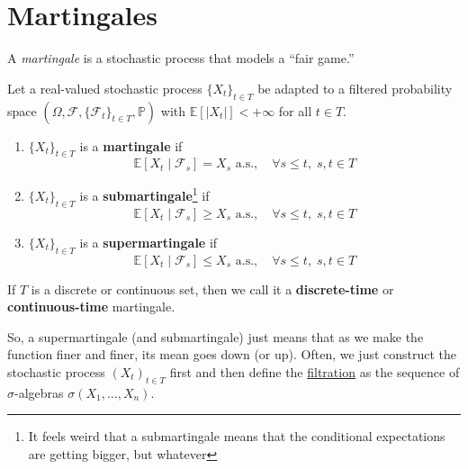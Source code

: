 \section{Martingales}

	A \textit{martingale} is a stochastic process that models a ``fair game.'' 

	\begin{definition}
		\label{def:martingale}
		Let a real-valued stochastic process $\{X_t\}_{t \in T}$ be adapted to a filtered probability space $(\Omega, \mathcal{F}, \{\mathcal{F}_t\}_{t \in T}, \mathbb{P})$ with $\mathbb{E}[|X_t|] < +\infty$ for all $t \in T$. 
		\begin{enumerate}
			\item $\{X_t\}_{t \in T}$ is a \textbf{martingale} if 
				\begin{equation}
					\mathbb{E}[X_t \mid \mathcal{F}_s] = X_s \text{ a.s.}, \quad \forall s \leq t, \; s, t \in T
				\end{equation}

			\item $\{X_t\}_{t \in T}$ is a \textbf{submartingale}\footnote{It feels weird that a submartingale means that the conditional expectations are getting bigger, but whatever} if 
				\begin{equation}
					\mathbb{E}[X_t \mid \mathcal{F}_s] \geq X_s \text{ a.s.}, \quad \forall s \leq t, \; s, t \in T
				\end{equation}

			\item $\{X_t\}_{t \in T}$ is a \textbf{supermartingale} if 
				\begin{equation}
					\mathbb{E}[X_t \mid \mathcal{F}_s] \leq X_s \text{ a.s.}, \quad \forall s \leq t, \; s, t \in T
				\end{equation}
		\end{enumerate}
		If $T$ is a discrete or continuous set, then we call it a \textbf{discrete-time} or \textbf{continuous-time} martingale. 
	\end{definition}

  So, a supermartingale (and submartingale) just means that as we make the function finer and finer, its mean goes down (or up). Often, we just construct the stochastic process $(X_t)_{t \in T}$ first and then define the \hyperref[def:filtration]{filtration} as the sequence of $\sigma$-algebras $\sigma(X_1, \ldots, X_n)$. 

